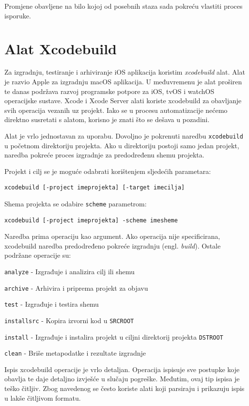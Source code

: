 \documentclass[times, utf8, diplomski, numeric]{fer}
\newcommand{\eng}[1]{(engl. \textit{#1})}
\begin{document}
\begin{appendices}
Promjene obavljene na bilo kojoj od posebnih staza sada pokreću vlastiti proces isporuke.


\chapter{Alat Xcodebuild} \label{header:xcodebuild}

Za izgradnju, testiranje i arhiviranje iOS aplikacija koristim \textit{xcodebuild} alat. Alat je razvio Apple za izgradnju macOS aplikacija. U međuvremenu je alat proširen te danas podržava razvoj programske potpore za iOS, tvOS i watchOS operacijske sustave. Xcode i Xcode Server alati koriste xcodebuild za obavljanje svih operacija vezanih uz projekt. Iako se u procesu automatizacije nećemo direktno susretati s alatom, korisno je znati što se dešava u pozadini.

Alat je vrlo jednostavan za uporabu. Dovoljno je pokrenuti naredbu \verb|xcodebuild| u početnom direktoriju projekta. Ako u direktoriju postoji samo jedan projekt, naredba pokreće proces izgradnje za predodređenu shemu projekta.

Projekt i cilj se je moguće odabrati korištenjem sljedećih parametara:

\begin{verbatim}
xcodebuild [-project imeprojekta] [-target imecilja]
\end{verbatim}

Shema projekta se odabire \verb|scheme| parametrom:

\begin{verbatim}
xcodebuild [-project imeprojekta] -scheme imesheme
\end{verbatim}

Naredba prima operaciju kao argument. Ako operacija nije specificirana, xcodebuild naredba predodređeno pokreće izgradnju \eng{build}. Ostale podržane operacije su:

\verb|analyze| - Izgrađuje i analizira cilj ili shemu

\verb|archive| - Arhivira i priprema projekt za objavu

\verb|test| - Izgrađuje i testira shemu

\verb|installsrc| - Kopira izvorni kod u \verb|SRCROOT|

\verb|install| - Izgrađuje i instalira projekt u ciljni direktorij projekta \verb|DSTROOT|

\verb|clean| - Briše metapodatke i rezultate izgradnje

Ispis xcodebuild operacije je vrlo detaljan. Operacija ispisuje sve postupke koje obavlja te daje detaljno izvješće u slučaju pogreške. Međutim, ovaj tip ispisa je teško čitljiv. Zbog navedenog se često koriste alati koji parsiraju i prikazuju ispis u lakše čitljivom formatu.


\end{appendices}
\end{document}

